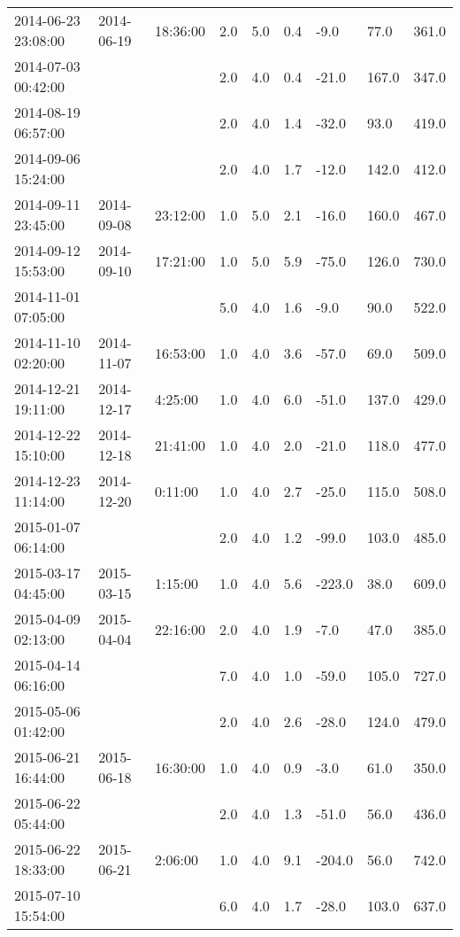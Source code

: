 \begin{longtable}{lllllllll}
        2014-06-23 23:08:00 & 2014-06-19 & 18:36:00 & 2.0 & 5.0 & 0.4 & -9.0 & 77.0 & 361.0 \\ 
        2014-07-03 00:42:00 & ~ & ~ & 2.0 & 4.0 & 0.4 & -21.0 & 167.0 & 347.0 \\ 
        2014-08-19 06:57:00 & ~ & ~ & 2.0 & 4.0 & 1.4 & -32.0 & 93.0 & 419.0 \\ 
        2014-09-06 15:24:00 & ~ & ~ & 2.0 & 4.0 & 1.7 & -12.0 & 142.0 & 412.0 \\ 
        2014-09-11 23:45:00 & 2014-09-08 & 23:12:00 & 1.0 & 5.0 & 2.1 & -16.0 & 160.0 & 467.0 \\ 
        2014-09-12 15:53:00 & 2014-09-10 & 17:21:00 & 1.0 & 5.0 & 5.9 & -75.0 & 126.0 & 730.0 \\ 
        2014-11-01 07:05:00 & ~ & ~ & 5.0 & 4.0 & 1.6 & -9.0 & 90.0 & 522.0 \\ 
        2014-11-10 02:20:00 & 2014-11-07 & 16:53:00 & 1.0 & 4.0 & 3.6 & -57.0 & 69.0 & 509.0 \\ 
        2014-12-21 19:11:00 & 2014-12-17 & 4:25:00 & 1.0 & 4.0 & 6.0 & -51.0 & 137.0 & 429.0 \\ 
        2014-12-22 15:10:00 & 2014-12-18 & 21:41:00 & 1.0 & 4.0 & 2.0 & -21.0 & 118.0 & 477.0 \\ 
        2014-12-23 11:14:00 & 2014-12-20 & 0:11:00 & 1.0 & 4.0 & 2.7 & -25.0 & 115.0 & 508.0 \\ 
        2015-01-07 06:14:00 & ~ & ~ & 2.0 & 4.0 & 1.2 & -99.0 & 103.0 & 485.0 \\ 
        2015-03-17 04:45:00 & 2015-03-15 & 1:15:00 & 1.0 & 4.0 & 5.6 & -223.0 & 38.0 & 609.0 \\ 
        2015-04-09 02:13:00 & 2015-04-04 & 22:16:00 & 2.0 & 4.0 & 1.9 & -7.0 & 47.0 & 385.0 \\ 
        2015-04-14 06:16:00 & ~ & ~ & 7.0 & 4.0 & 1.0 & -59.0 & 105.0 & 727.0 \\ 
        2015-05-06 01:42:00 & ~ & ~ & 2.0 & 4.0 & 2.6 & -28.0 & 124.0 & 479.0 \\ 
        2015-06-21 16:44:00 & 2015-06-18 & 16:30:00 & 1.0 & 4.0 & 0.9 & -3.0 & 61.0 & 350.0 \\ 
        2015-06-22 05:44:00 & ~ & ~ & 2.0 & 4.0 & 1.3 & -51.0 & 56.0 & 436.0 \\ 
        2015-06-22 18:33:00 & 2015-06-21 & 2:06:00 & 1.0 & 4.0 & 9.1 & -204.0 & 56.0 & 742.0 \\ 
        2015-07-10 15:54:00 & ~ & ~ & 6.0 & 4.0 & 1.7 & -28.0 & 103.0 & 637.0 \\ 

\end{longtable}
